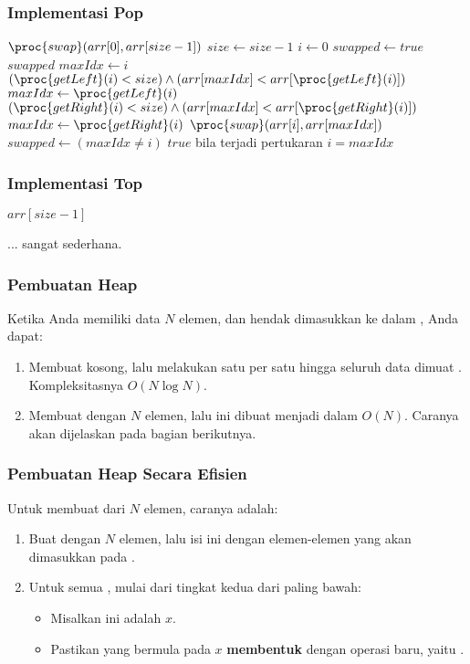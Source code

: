 \begin{frame}
\frametitle{Implementasi Pop}
\begin{codebox}
\li $\proc{swap}(arr[0], arr[size-1])$
\li $size \gets size - 1$
\li $i \gets 0$
\li $swapped \gets true$
\li \While $swapped$  \Do
\li   $maxIdx \gets i$
\li   \If $(\proc{getLeft}(i) < size) \land (arr[maxIdx] < arr[\proc{getLeft}(i)])$ \Then
\li     $maxIdx \gets \proc{getLeft}(i)$
      \End
\li   \If $(\proc{getRight}(i) < size) \land (arr[maxIdx] < arr[\proc{getRight}(i)])$ \Then
\li     $maxIdx \gets \proc{getRight}(i)$
      \End
\li   $\proc{swap}(arr[i], arr[maxIdx])$
\li   $swapped \gets (maxIdx \ne i)$ 
\Comment $true$ bila terjadi pertukaran
\li   $i = maxIdx$
    \End
\end{codebox}
\end{frame}

\begin{frame}
\frametitle{Implementasi Top}
\begin{codebox}
  \Return $arr[size-1]$
\end{codebox}

... sangat sederhana.
\end{frame}

\begin{frame}
\frametitle{Pembuatan Heap}
Ketika Anda memiliki data $N$ elemen, dan hendak dimasukkan ke dalam \pheap, Anda dapat:
\begin{enumerate}
  \item Membuat \pheap kosong, lalu melakukan  satu per satu hingga seluruh data dimuat \pheap. Kompleksitasnya $O(N \log{N})$.
  \item Membuat \farray dengan $N$ elemen, lalu \farray ini dibuat menjadi \pheap dalam $O(N)$. Caranya akan dijelaskan pada bagian berikutnya.
\end{enumerate}
\end{frame}

\begin{frame}
\frametitle{Pembuatan Heap Secara Efisien}
Untuk membuat \pheap dari $N$ elemen, caranya adalah:
\begin{enumerate}
  \item Buat \farray dengan $N$ elemen, lalu isi \farray ini dengan elemen-elemen yang akan dimasukkan pada \pheap.
  \item Untuk semua \fnode, mulai dari tingkat kedua dari paling bawah:
  \begin{itemize}
    \item Misalkan \fnode ini adalah \fnode $x$.
    \item Pastikan \fsubtree yang bermula pada \fnode $x$ \textbf{membentuk \pheap} dengan operasi baru, yaitu .
  \end{itemize}
\end{enumerate}
\end{frame}

